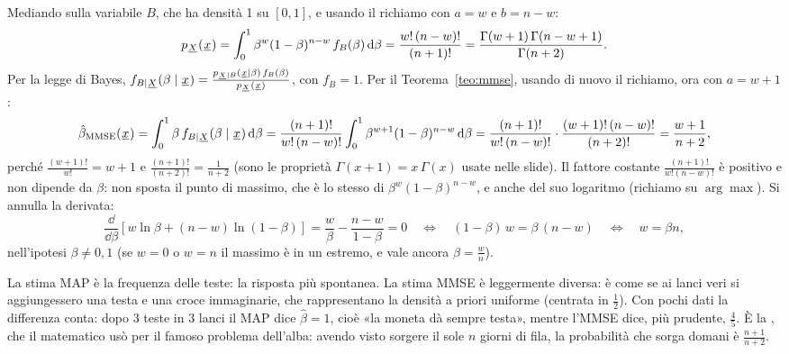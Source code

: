 \begin{dimostrazione}
 Mediando sulla variabile $B$, che ha densità 1 su $[0, 1]$, e usando il richiamo con $a = w$
e $b = n - w$:
\[ p_{{\mkern1mu\underline{X}\mkern1mu}}({\mkern1mu\underline{x}\mkern1mu}) = \int_0^1 \beta^{w} (1 - \beta)^{n - w}\, f_B(\beta) \,\mathrm{d}\beta = \frac{w!\, (n - w)!}{(n +
   1)!} = \frac{\Gamma(w + 1)\, \Gamma(n - w + 1)}{\Gamma(n + 2)} . \]
 Per la legge di Bayes, $f_{B \mid {\mkern1mu\underline{X}\mkern1mu}}(\beta \mid {\mkern1mu\underline{x}\mkern1mu}) =
\frac{p_{{\mkern1mu\underline{X}\mkern1mu} \mid B}({\mkern1mu\underline{x}\mkern1mu} \mid \beta)\, f_B(\beta)}{p_{{\mkern1mu\underline{X}\mkern1mu}}({\mkern1mu\underline{x}\mkern1mu})}$, con $f_B = 1$.
 Per il Teorema~\ref{teo:mmse}, usando di nuovo il richiamo, ora con $a = w + 1$:
\[ \hat\beta_{\text{MMSE}}({\mkern1mu\underline{x}\mkern1mu}) = \int_0^1 \beta\, f_{B \mid {\mkern1mu\underline{X}\mkern1mu}}(\beta \mid {\mkern1mu\underline{x}\mkern1mu}) \,\mathrm{d}\beta =
   \frac{(n + 1)!}{w!\, (n - w)!} \int_0^1 \beta^{w + 1} (1 - \beta)^{n - w} \,\mathrm{d}\beta = \frac{(n + 1)!}{w!\, (n - w)!}
   \cdot \frac{(w + 1)!\, (n - w)!}{(n + 2)!} = \frac{w + 1}{n + 2} , \]
perché $\frac{(w + 1)!}{w!} = w + 1$ e $\frac{(n + 1)!}{(n + 2)!} = \frac{1}{n + 2}$ (sono le proprietà
$\Gamma(x + 1) = x\,\Gamma(x)$ usate nelle slide).
 Il fattore costante $\frac{(n + 1)!}{w!(n - w)!}$ è positivo e non dipende da
$\beta$: non sposta il punto di massimo, che è lo stesso di $\beta^{w} (1 - \beta)^{n - w}$, e anche del suo logaritmo
(richiamo su $\arg\max$). Si annulla la derivata:
\[ \frac{\dd}{\dd\beta} \left[ w \ln \beta + (n - w) \ln (1 - \beta) \right] = \frac{w}{\beta} - \frac{n - w}{1 - \beta} =
   0 \quad\iff\quad (1 - \beta)\, w = \beta\, (n - w) \quad\iff\quad w = \beta n , \]
nell'ipotesi $\beta \neq 0, 1$ (se $w = 0$ o $w = n$ il massimo è in un estremo, e vale ancora $\beta = \frac{w}{n}$).
\end{dimostrazione}

La stima MAP è la frequenza delle teste: la risposta più spontanea. La stima MMSE è leggermente diversa: è come se ai
lanci veri si aggiungessero una testa e una croce immaginarie, che rappresentano la densità a priori uniforme (centrata
in $\frac12$). Con pochi dati la differenza conta: dopo 3 teste in 3 lanci il MAP dice $\hat\beta = 1$, cioè «la moneta
dà sempre testa», mentre l'MMSE dice, più prudente, $\frac{4}{5}$. È la , che il
matematico usò per il famoso problema dell'alba: avendo visto sorgere il sole $n$ giorni di fila, la probabilità che
sorga domani è $\frac{n + 1}{n + 2}$.

